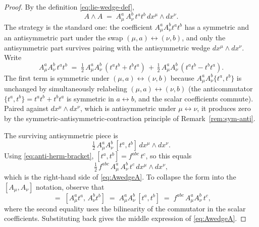 \begin{proof}
By the definition \eqref{eq:lie-wedge-def},
\begin{equation*}
A \wedge A \;=\; A_\mu^a\, A_\nu^b\, t^a t^b\, dx^\mu \wedge dx^\nu.
\end{equation*}
The strategy is the standard one: the coefficient $A_\mu^a A_\nu^b t^a t^b$ has a symmetric and an antisymmetric part under the swap $(\mu, a) \leftrightarrow (\nu, b)$, and only the antisymmetric part survives pairing with the antisymmetric wedge $dx^\mu \wedge dx^\nu$. Write
\begin{equation*}
A_\mu^a A_\nu^b\, t^a t^b \;=\; \tfrac{1}{2}\,A_\mu^a A_\nu^b\, \left(t^a t^b + t^b t^a\right) \,+\, \tfrac{1}{2}\,A_\mu^a A_\nu^b\, \left(t^a t^b - t^b t^a\right).
\end{equation*}
The first term is symmetric under $(\mu, a)\leftrightarrow(\nu, b)$ because $A_\mu^a A_\nu^b \{t^a, t^b\}$ is unchanged by simultaneously relabeling $(\mu, a)\leftrightarrow(\nu, b)$ (the anticommutator $\{t^a, t^b\} = t^at^b + t^bt^a$ is symmetric in $a\leftrightarrow b$, and the scalar coefficients commute). Paired against $dx^\mu \wedge dx^\nu$, which is antisymmetric under $\mu \leftrightarrow \nu$, it produces zero by the symmetric-antisymmetric-contraction principle of Remark~\ref{rem:sym-anti}.

\medskip

\noindent The surviving antisymmetric piece is
\begin{equation*}
\tfrac{1}{2}\,A_\mu^a A_\nu^b\,[t^a, t^b]\, dx^\mu \wedge dx^\nu.
\end{equation*}
Using \eqref{eq:anti-herm-bracket}, $[t^a, t^b] = f^{abc}\, t^c$, so this equals
\begin{equation*}
\tfrac{1}{2}\,f^{abc}\,A_\mu^a\, A_\nu^b\, t^c\, dx^\mu \wedge dx^\nu,
\end{equation*}
which is the right-hand side of \eqref{eq:AwedgeA}. To collapse the form into the $[A_\mu, A_\nu]$ notation, observe that
\begin{equation*}
[A_\mu, A_\nu] \;=\; [A_\mu^a t^a,\, A_\nu^b t^b] \;=\; A_\mu^a A_\nu^b\, [t^a, t^b] \;=\; f^{abc}\, A_\mu^a A_\nu^b\, t^c,
\end{equation*}
where the second equality uses the bilinearity of the commutator in the scalar coefficients. Substituting back gives the middle expression of \eqref{eq:AwedgeA}.
\end{proof}


